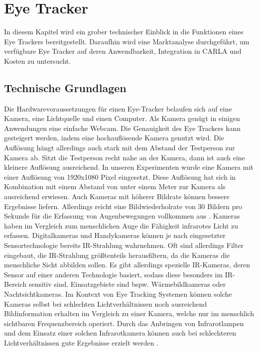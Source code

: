 \chapter{Eye Tracker}
\label{sec:eye tracker}

In diesem Kapitel wird ein grober technischer Einblick in die Funktionen eines Eye Trackers bereitgestellt. Daraufhin wird eine Marktanalyse durchgeführt, um verfügbare Eye Tracker auf deren Anwendbarkeit, Integration in CARLA und Kosten zu untersucht.

\section{Technische Grundlagen}

Die Hardwarevoraussetzungen für einen Eye-Tracker belaufen sich auf eine Kamera, eine Lichtquelle und einen Computer. Als Kamera genügt in einigen Anwendungen eine einfache Webcam. Die Genauigkeit des Eye Trackers kann gesteigert werden, indem eine hochauflösende Kamera genutzt wird. Die Auflösung hängt allerdings auch stark mit dem Abstand der Testperson zur Kamera ab. Sitzt die Testperson recht nahe an der Kamera, dann ist auch eine kleinere Auflösung ausreichend. In unseren Experimenten wurde eine Kamera mit einer Auflösung von 1920x1080 Pixel eingesetzt. Diese Auflösung hat sich in Kombination mit einem Abstand von unter einem Meter zur Kamera als ausreichend erwiesen. Auch Kameras mit höherer Bildrate können bessere Ergebnisse liefern. Allerdings reicht eine Bildwiederholrate von 30 Bildern pro Sekunde für die Erfassung von Augenbewegungen vollkommen aus  \cite{lit_tracking_framerate}. Kameras haben im Vergleich zum menschlichen Auge die Fähigkeit infrarotes Licht zu erfassen. Digitalkameras und Handykameras können je nach eingesetzter Sensortechnologie bereits IR-Strahlung wahrnehmen. Oft sind allerdings Filter eingebaut, die IR-Strahlung größtenteils herausfiltern, da die Kameras die menschliche Sicht abbilden sollen. Es gibt allerdings spezielle IR-Kameras, deren Sensor auf einer anderen Technologie basiert, sodass diese besonders im IR-Bereich sensitiv sind. Einsatzgebiete sind bspw. Wärmebildkameras oder Nachtsichtkameras. Im Kontext von Eye Tracking Systemen können solche Kameras selbst bei schlechten Lichtverhältnissen noch ausreichend Bildinformation erhalten im Vergleich zu einer Kamera, welche nur im menschlich sichtbaren Frequenzbereich operiert. \cite{lit_article_infrared}
Durch das Anbringen von Infrarotlampen und dem Einsatz einer solchen Infrarotkamera können auch bei schlechteren Lichtverhältnissen gute Ergebnisse erzielt werden \cite{lit_article_stateoftheart_eyetracker}.


